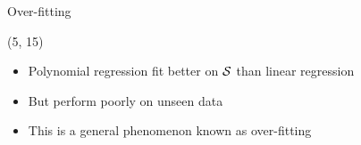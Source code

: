 \begin{frame}{Over-fitting}

  \begin{textblock}{35}(5, 15)
    \begin{itemize}
    \item<3-> Polynomial regression fit better on $\mathcal{S}$ than linear regression
    \item<4-> But perform poorly on unseen data
    \item<4-> This is a general phenomenon known as over-fitting
    \end{itemize}
  \end{textblock}


\end{frame}
